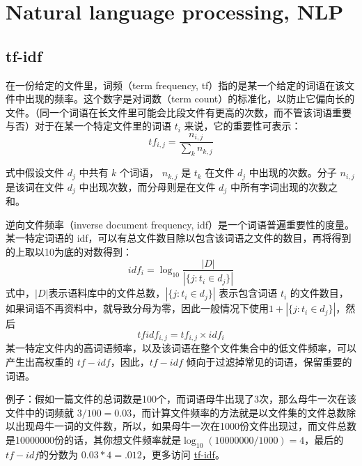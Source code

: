 \chapter{Natural language processing, NLP}
\section{tf-idf}
在一份给定的文件里，词频（term frequency, tf）指的是某一个给定的词语在该文件中出现的频率。这个数字是对词数（term count）的标准化，以防止它偏向长的文件。（同一个词语在长文件里可能会比段文件有更高的次数，而不管该词语重要与否）对于在某一个特定文件里的词语 $t_i$ 来说，它的重要性可表示：
\begin{equation}
    tf_{i,j}=\frac{n_{i,j}}{\sum_k n_{k,j}}
\end{equation}

式中假设文件 $d_j$ 中共有 $k$ 个词语， $n_{k, j}$ 是 $t_k$ 在文件 $d_j$ 中出现的次数。分子 $n_{i,j}$ 是该词在文件 $d_j$ 中出现次数，而分母则是在文件 $d_j$ 中所有字词出现的次数之和。

逆向文件频率（inverse document frequency, idf）是一个词语普遍重要性的度量。某一特定词语的 idf，可以有总文件数目除以包含该词语之文件的数目，再将得到的上取以10为底的对数得到：
\begin{equation}
    idf_i=\log_{10}\frac{|D|}{|\{j:t_i\in d_j\}|}
\end{equation}
式中，$|D|$表示语料库中的文件总数，$|\{j:t_i\in d_j\}|$ 表示包含词语 $t_i$ 的文件数目，如果词语不再资料中，就导致分母为零，因此一般情况下使用$1+ |\{j:t_i\in d_j\}|$，然后
\begin{equation}
    tfidf_{i,j}=tf_{i,j}\times idf_i
\end{equation}
某一特定文件内的高词语频率，以及该词语在整个文件集合中的低文件频率，可以产生出高权重的 $tf-idf$，因此，$tf-idf$ 倾向于过滤掉常见的词语，保留重要的词语。

例子：假如一篇文件的总词数是100个，而词语母牛出现了3次，那么母牛一次在该文件中的词频就 $3/100=0.03$，而计算文件频率的方法就是以文件集的文件总数除以出现母牛一词的文件数，所以，如果母牛一次在1000份文件出现过，而文件总数是10000000份的话，其你想文件频率就是$\log_{10}(10000000/1000)=4$，最后的 $tf-idf$的分数为 $0.03 * 4=.012$，更多访问 \href{https://zh.wikipedia.org/wiki/Tf-idf}{tf-idf}。

